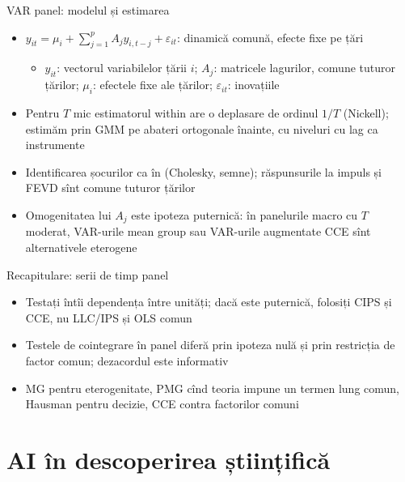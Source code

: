 \begin{frame}{VAR panel: modelul și estimarea}
\itemsize{\small}
\begin{itemize}
    \item $y_{it} = \mu_i + \sum_{j=1}^pA_jy_{i,t-j} + \varepsilon_{it}$: dinamică comună, efecte fixe pe țări 
    \begin{itemize}
        \item $y_{it}$: vectorul variabilelor țării $i$; $A_j$: matricele lagurilor, comune tuturor țărilor; $\mu_i$: efectele fixe ale țărilor; $\varepsilon_{it}$: inovațiile
    \end{itemize}
    \item Pentru $T$ mic estimatorul within are o deplasare de ordinul $1/T$ (Nickell); estimăm prin GMM pe abateri ortogonale înainte, cu niveluri cu lag ca instrumente 
    \item Identificarea șocurilor ca în  (Cholesky, semne); răspunsurile la impuls și FEVD sînt comune tuturor țărilor
    \item Omogenitatea lui $A_j$ este ipoteza puternică: în panelurile macro cu $T$ moderat, VAR-urile mean group sau VAR-urile augmentate CCE sînt alternativele eterogene
\end{itemize}
\end{frame}

\begin{frame}{Recapitulare: serii de timp panel}
\itemsize{\small}
\begin{itemize}
    \item Testați întîi dependența între unități; dacă este puternică, folosiți CIPS și CCE, nu LLC/IPS și OLS comun
    \item Testele de cointegrare în panel diferă prin ipoteza nulă și prin restricția de factor comun; dezacordul este informativ
    \item MG pentru eterogenitate, PMG cînd teoria impune un termen lung comun, Hausman pentru decizie, CCE contra factorilor comuni
\end{itemize}
\end{frame}


\section{AI în descoperirea științifică}


